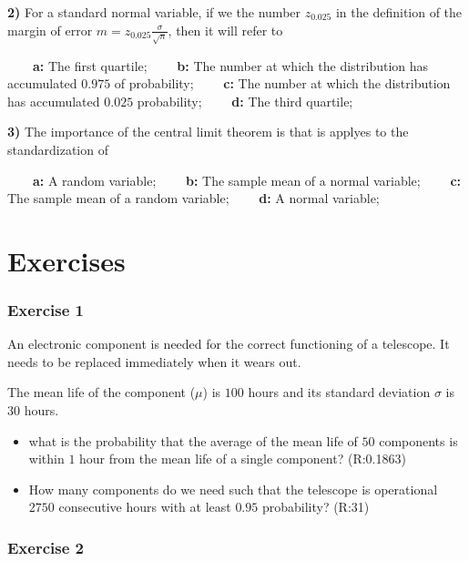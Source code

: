 \documentclass[
]{book}
\begin{document}
\textbf{2)} For a standard normal variable, if we the number \(z_{0.025}\) in the definition of the margin of error \(m=z_{0.025} \frac{\sigma}{\sqrt{n}}\), then it will refer to

\textbf{\(\qquad\)a:} The first quartile; \textbf{\(\qquad\)b:} The number at which the distribution has accumulated \(0.975\) of probability; \textbf{\(\qquad\)c:} The number at which the distribution has accumulated \(0.025\) probability; \textbf{\(\qquad\)d:} The third quartile;

\textbf{3)} The importance of the central limit theorem is that is applyes to the standardization of

\textbf{\(\qquad\)a:} A random variable;
\textbf{\(\qquad\)b:} The sample mean of a normal variable;
\textbf{\(\qquad\)c:} The sample mean of a random variable;
\textbf{\(\qquad\)d:} A normal variable;

\hypertarget{exercises-9}{%
\section{Exercises}\label{exercises-9}}

\hypertarget{exercise-1-8}{%
\subsubsection{Exercise 1}\label{exercise-1-8}}

An electronic component is needed for the correct functioning of a telescope. It needs to be replaced immediately when it wears out.

The mean life of the component (\(\mu\)) is \(100\) hours and its standard deviation \(\sigma\) is \(30\) hours.

\begin{itemize}
\item
  what is the probability that the average of the mean life of \(50\) components is within \(1\) hour from the mean life of a single component? (R:0.1863)
\item
  How many components do we need such that the telescope is operational \(2750\) consecutive hours with at least \(0.95\) probability? (R:31)
\end{itemize}

\hypertarget{exercise-2-8}{%
\subsubsection{Exercise 2}\label{exercise-2-8}}
\end{document}
